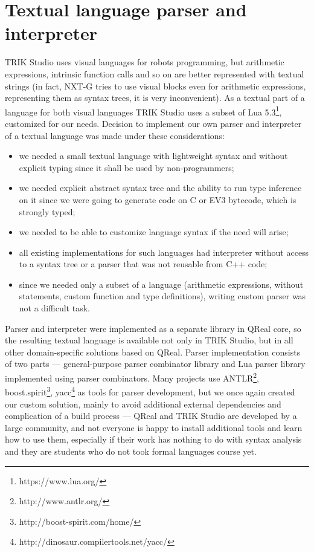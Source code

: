 \documentclass[conference]{IEEEtran}
\begin{document}
\section{Textual language parser and interpreter}
\label{chapter:parser}
TRIK Studio uses visual languages for robots programming, but arithmetic expressions, intrinsic function calls and so on are better represented with textual strings (in fact, NXT-G tries to use visual blocks even for arithmetic expressions, representing them as syntax trees, it is very inconvenient). As a textual part of a language for both visual languages TRIK Studio uses a subset of Lua 5.3\footnote{https://www.lua.org/}, customized for our needs. Decision to implement our own parser and interpreter of a textual language was made under these considerations:
\begin{itemize}
	\item we needed a small textual language with lightweight syntax and without explicit typing since it shall be used by non-programmers;
	\item we needed explicit abstract syntax tree and the ability to run type inference on it since we were going to generate code on C or EV3 bytecode, which is strongly typed;
	\item we needed to be able to customize language syntax if the need will arise;
	\item all existing implementations for such languages had interpreter without access to a syntax tree or a parser that was not reusable from C++ code;
	\item since we needed only a subset of a language (arithmetic expressions, without statements, custom function and type definitions), writing custom parser was not a difficult task.
\end{itemize}

Parser and interpreter were implemented as a separate library in QReal core, so the resulting textual language is available not only in TRIK Studio, but in all other domain-specific solutions based on QReal. Parser implementation consists of two parts --- general-purpose parser combinator library and Lua parser library implemented using parser combinators. Many projects use ANTLR\footnote{http://www.antlr.org/}, boost.spirit\footnote{http://boost-spirit.com/home/}, yacc\footnote{http://dinosaur.compilertools.net/yacc/} as tools for parser development, but we once again created our custom solution, mainly to avoid additional external dependencies and complication of a build process --- QReal and TRIK Studio are developed by a large community, and not everyone is happy to install additional tools and learn how to use them, especially if their work has nothing to do with syntax analysis and they are students who do not took formal languages course yet.
\end{document}
